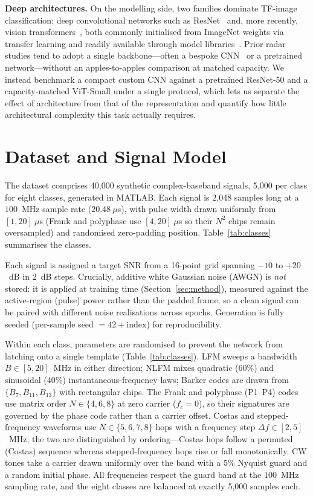 \documentclass[journal]{IEEEtran}
\begin{document}
\textbf{Deep architectures.} On the modelling side, two families dominate TF-image
classification: deep convolutional networks such as ResNet~\cite{he2016resnet} and,
more recently, vision transformers~\cite{dosovitskiy2021vit}, both commonly
initialised from ImageNet weights via transfer learning and readily available
through model libraries~\cite{wightman2019timm}. Prior radar studies tend to adopt
a single backbone---often a bespoke CNN~\cite{kong2018cnn,qu2018intrapulse} or a
pretrained network---without an apples-to-apples comparison at matched capacity.
We instead benchmark a compact custom CNN against a pretrained ResNet-50 and a
capacity-matched ViT-Small under a single protocol, which lets us separate the
effect of architecture from that of the representation and quantify how little
architectural complexity this task actually requires.

\section{Dataset and Signal Model}
The dataset comprises 40{,}000 synthetic complex-baseband signals, 5{,}000 per
class for eight classes, generated in MATLAB. Each signal is 2{,}048 samples long
at a $100$~MHz sample rate ($20.48~\mu$s), with pulse width drawn uniformly from
$[1,20]~\mu$s (Frank and polyphase use $[4,20]~\mu$s so their $N^2$ chips remain
oversampled) and randomised zero-padding position. Table~\ref{tab:classes}
summarises the classes.

Each signal is assigned a target SNR from a 16-point grid spanning $-10$ to
$+20$~dB in $2$~dB steps. Crucially, additive white Gaussian noise (AWGN) is
\emph{not} stored: it is applied at training time (Section~\ref{sec:method}),
measured against the active-region (pulse) power rather than the padded frame, so
a clean signal can be paired with different noise realisations across epochs.
Generation is fully seeded (per-sample seed $= 42 + \text{index}$) for
reproducibility.

Within each class, parameters are randomised to prevent the network from latching
onto a single template (Table~\ref{tab:classes}). LFM sweeps a bandwidth
$B\in[5,20]$~MHz in either direction; NLFM mixes quadratic (60\%) and sinusoidal
(40\%) instantaneous-frequency laws; Barker codes are drawn from
$\{B_7,B_{11},B_{13}\}$ with rectangular chips. The Frank and polyphase (P1--P4)
codes use matrix order $N\in\{4,6,8\}$ at zero carrier ($f_c=0$), so their
signatures are governed by the phase code rather than a carrier offset. Costas and
stepped-frequency waveforms use $N\in\{5,6,7,8\}$ hops with a frequency step
$\Delta f\in[2,5]$~MHz; the two are distinguished by ordering---Costas hops follow
a permuted (Costas) sequence whereas stepped-frequency hops rise or fall
monotonically. CW tones take a carrier drawn uniformly over the band with a 5\%
Nyquist guard and a random initial phase. All frequencies respect the guard band
at the $100$~MHz sampling rate, and the eight classes are balanced at exactly
5{,}000 samples each.
\end{document}

